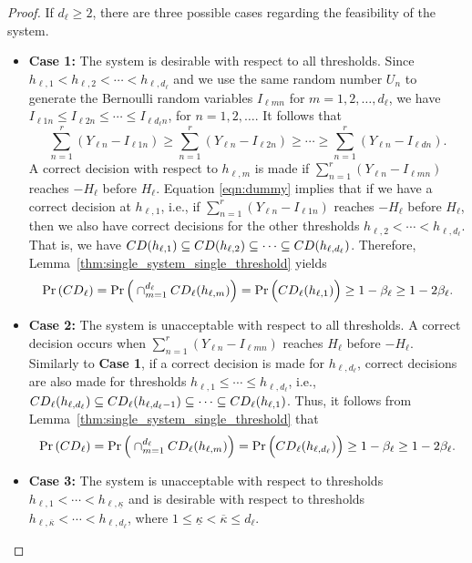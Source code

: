 \documentclass[10pt,a4paper]{amsart}
\begin{document}
\begin{proof}
If $d_\ell \ge 2$, there are three possible cases regarding the feasibility of the system. 
\begin{itemize}
    \item[] {\bf Case 1:}  The system is desirable with respect to all thresholds. Since $h_{\ell,1} < h_{\ell,2} < \cdots < h_{\ell,d_\ell}$ and we use the same random number $U_{n}$ to generate the Bernoulli random variables $I_{\ell mn}$ for $m=1,2,\ldots,d_\ell$, we have $I_{\ell 1n} \le I_{\ell 2n} \le \cdots \le I_{\ell d_\ell n}$, for $n=1,2,\ldots$. It follows that
    \begin{equation} \label{eqn:dummy}
    \sum_{n=1}^{r}\left(Y_{\ell n} -I_{\ell 1n}\right) \ge \sum_{n=1}^{r}\left(Y_{\ell n} -I_{\ell 2n}\right)\ge \cdots \ge \sum_{n=1}^{r}\left(Y_{\ell n} -I_{\ell d n}\right).
    \end{equation}
    A correct decision with respect to $h_{\ell, m}$ is made if $\sum_{n=1}^{r}(Y_{\ell n} -I_{\ell mn})$ reaches $-H_\ell$ before $H_\ell$. Equation \eqref{eqn:dummy} implies that if we have a correct decision at $h_{\ell, 1}$, i.e.,  if $\sum_{n=1}^{r}(Y_{\ell n} -I_{\ell 1n})$ reaches $-H_\ell$ before $H_\ell$, then we also have correct decisions for the other thresholds $h_{\ell, 2}< \cdots < h_{\ell, d_\ell}$. That is, we have ${\rm CD}(h_{\ell,1}) \subseteq {\rm CD}(h_{\ell, 2}) \subseteq \cdots \subseteq {\rm CD}(h_{\ell, d_\ell})$. Therefore, Lemma~\ref{thm:single_system_single_threshold} yields
    \[ 
    \Pr\left( {\rm CD}_\ell \right)=\Pr\Big(\cap_{m=1}^{d_\ell} {\rm CD}_\ell(h_{\ell, m})\Big) = \Pr\Big( {\rm CD}_\ell(h_{\ell,1})\Big) \ge 1 - \beta_\ell \ge 1 - 2 \beta_\ell.
    \] 
    \item[] {\bf Case 2:} The system is unacceptable with respect to all thresholds. A correct decision occurs when $\sum_{n=1}^{r}(Y_{\ell n} -I_{\ell mn})$ reaches $H_\ell$ before $-H_\ell$. Similarly to {\bf Case 1}, if a correct decision is made for $h_{\ell, d_\ell}$, correct decisions are also made for thresholds $h_{\ell, 1}\leq \cdots\leq h_{\ell, d_\ell}$, i.e., ${\rm CD}_\ell(h_{\ell, d_\ell}) \subseteq {\rm CD}_\ell(h_{\ell,d_\ell-1}) \subseteq \cdots \subseteq {\rm CD}_\ell(h_{\ell,1})$. Thus, it follows from Lemma~\ref{thm:single_system_single_threshold} that
    \[ 
    \Pr\left( {\rm CD}_\ell \right)=\Pr\Big(\cap_{m=1}^{d_\ell} {\rm CD}_\ell(h_{\ell,m})\Big) = \Pr\Big( {\rm CD}_\ell(h_{\ell,d_\ell})\Big) \ge 1 - \beta_\ell \ge 1 - 2\beta_\ell.
    \]
    \item[] {\bf Case 3:} The system is unacceptable with respect to thresholds $h_{\ell, 1} < \cdots < h_{\ell, \underline{\kappa}}$ and is desirable with respect to thresholds $h_{\ell, \overline{\kappa}} < \cdots < h_{\ell,d_\ell}$, where $1\leq \underline{\kappa} <  \overline{\kappa}\leq d_\ell$.

\end{itemize}
\end{proof}
\end{document}
